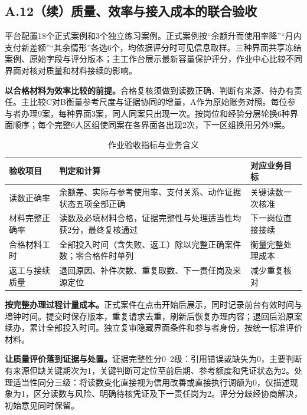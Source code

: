 
\clearpage\subsection*{A.12（续）质量、效率与接入成本的联合验收}
平台配置18个正式案例和3个独立练习案例。正式案例按“余额升而使用率降”“月内支付新差额”“其余情形”各选6个，均依据评分时可见信息取样。三种界面共享冻结案例、原始字段与评分版本；主工作台展示最新容量保护评分，作业中心比较不同界面对核对质量和材料接续的影响。

\textbf{以合格材料为效率比较的前提。}合格复核须做到读数正确、判断有来源、待办有责任。主比较C对B衡量参考尺度与证据协同的增量，A作为原始账务对照。每位参与者办理9案，每种界面3案，同人同案只出现一次。按岗位和经验分层轮换6种界面顺序；每个完整6人区组使同案在各界面各出现2次，下一区组换用另外9案。

\begin{table}[H]\centering\caption{作业验收指标与业务含义}\small\renewcommand{\arraystretch}{1.2}
\begin{tabularx}{\linewidth}{@{}p{24mm}Yp{29mm}@{}}\toprule
验收项目 & 判定和计算 & 对应业务目标\\\midrule
读数正确率 & 余额差、实际与参考使用率、支付关系、动作证据状态五项全部正确 & 关键读数一次核准\\\addlinespace[3bp]
材料完整正确率 & 读数及必填材料合格，证据完整性与处理适当性均获2分，最终复核通过 & 下一岗位直接接续\\\addlinespace[3bp]
合格材料工时 & 全部投入时间（含失败、返工）除以完整正确案件数；零合格件时单列 & 衡量完整处理成本\\\addlinespace[3bp]
返工与接续质量 & 退回原因、补件次数、重复取数、下一责任岗及来源定位 & 减少重复核对\\\bottomrule
\end{tabularx}\end{table}

\textbf{按完整办理过程计量成本。}正式案件在点击开始后展示，同时记录前台有效时间与墙钟时间。提交时保存版本，重复请求去重，刷新后恢复办理内容；退回后沿原案续办，累计全部投入时间。独立复审隐藏界面条件和参与者身份，按统一标准评价材料。

\textbf{让质量评价落到证据与处置。}证据完整性分0--2级：引用错误或缺失为0，主要判断有来源但缺关键期次为1，关键判断可定位至前后期、参考额度和凭证状态为2。处理适当性同分三级：将读数变化直接视为信用改善或直接执行调额为0，仅描述现象为1，区分读数与风险、明确待核凭证及下一责任岗为2。评分分歧经协商解决，初始意见同时保留。

